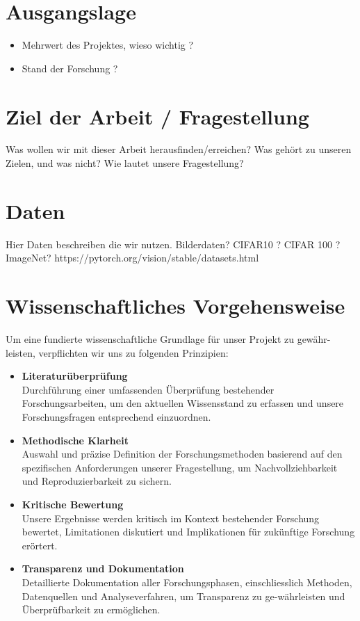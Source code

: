 \newpage
\section{Ausgangslage}
\begin{itemize}
    \item Mehrwert des Projektes, wieso wichtig ?
    \item Stand der Forschung ?
\end{itemize}

\section{Ziel der Arbeit / Fragestellung}
Was wollen wir mit dieser Arbeit herausfinden/erreichen?
Was gehört zu unseren Zielen, und was nicht?
Wie lautet unsere Fragestellung?

\section{Daten}
Hier Daten beschreiben die wir nutzen.
Bilderdaten?
CIFAR10 ? CIFAR 100 ? ImageNet? 
https://pytorch.org/vision/stable/datasets.html

\section{Wissenschaftliches Vorgehensweise}

Um eine fundierte wissenschaftliche Grundlage für unser Projekt zu gewähr-leisten, verpflichten wir uns zu folgenden Prinzipien:

\begin{itemize}
    \item \textbf{Literaturüberprüfung} \\
    Durchführung einer umfassenden Überprüfung bestehender Forschungsarbeiten, um den aktuellen Wissensstand zu erfassen und unsere Forschungsfragen entsprechend einzuordnen.
    
    \item \textbf{Methodische Klarheit} \\ 
    Auswahl und präzise Definition der Forschungsmethoden basierend auf den spezifischen Anforderungen unserer Fragestellung, um Nachvollziehbarkeit und Reproduzierbarkeit zu sichern.
    
    \item \textbf{Kritische Bewertung} \\
    Unsere Ergebnisse werden kritisch im Kontext bestehender Forschung bewertet, Limitationen diskutiert und Implikationen für zukünftige Forschung erörtert.
    
    \item \textbf{Transparenz und Dokumentation} \\
    Detaillierte Dokumentation aller Forschungsphasen, einschliesslich Methoden, Datenquellen und Analyseverfahren, um Transparenz zu ge-währleisten und Überprüfbarkeit zu ermöglichen.
    
\end{itemize}

